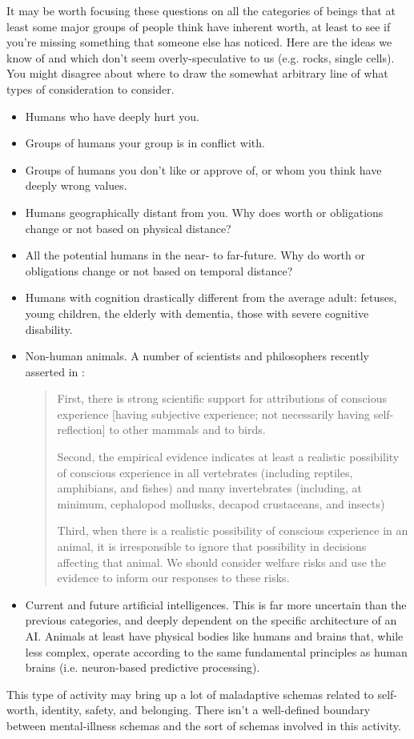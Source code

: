 \documentclass[12pt,letterpaper]{book}
\begin{document}
It may be worth focusing these questions on all the categories of beings that at least some major groups of people think have inherent worth, at least to see if you're missing something that someone else has noticed. Here are the ideas we know of and which don't seem overly-speculative to us (e.g. rocks, single cells). You might disagree about where to draw the somewhat arbitrary line of what types of consideration to consider.
\begin{itemize}
    \item Humans who have deeply hurt you.
    \item Groups of humans your group is in conflict with.
    \item Groups of humans you don't like or approve of, or whom you think have deeply wrong values.
    \item Humans geographically distant from you. Why does worth or obligations change or not based on physical distance?
    \item All the potential humans in the near- to far-future. Why do worth or obligations change or not based on temporal distance?
    \item Humans with cognition drastically different from the average adult: fetuses, young children, the elderly with dementia, those with severe cognitive disability.
    \item Non-human animals. A number of scientists and philosophers recently asserted in \textcite{newYorkAnimal}:
        \begin{quotation}
            First, there is strong scientific support for attributions of conscious experience [having subjective experience; not necessarily having self-reflection] to other mammals and to birds.
            
            Second, the empirical evidence indicates at least a realistic possibility of conscious experience in all vertebrates (including reptiles, amphibians, and fishes) and many invertebrates (including, at minimum, cephalopod mollusks, decapod crustaceans, and insects)

            Third, when there is a realistic possibility of conscious experience in an animal, it is irresponsible to ignore that possibility in decisions affecting that animal. We should consider welfare risks and use the evidence to inform our responses to these risks.
        \end{quotation}
    \item Current and future artificial intelligences. This is far more uncertain than the previous categories, and deeply dependent on the specific architecture of an AI. Animals at least have physical bodies like humans and brains that, while less complex, operate according to the same fundamental principles as human brains (i.e. neuron-based predictive processing).
\end{itemize}
This type of activity may bring up a lot of maladaptive schemas related to self-worth, identity, safety, and belonging. There isn't a well-defined boundary between mental-illness schemas and the sort of schemas involved in this activity.
\end{document}
